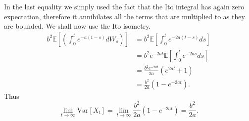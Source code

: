 \documentclass[a4paper,12pt]{article} %
\newcommand{\Var}{\mathrm{Var}}
\begin{document}
In the last equality we simply used the fact that the Ito integral has again zero expectation, therefore it annihilates all the terms that are multiplied to as they are bounded. We shall now use the Ito isometry.
\begin{align*}
    b^2 \mathbb{E} \left[ \left( \int _0^t e^{-a(t-s)}dW_s \right)  \right] & = b^{2} \mathbb{E} \left[ \int _0^t e^{-2a(t-s)}ds \right]   \\
                                                                            & = b^2 e^{-2at}\mathbb{E} \left[ \int _0^t e^{-2as}ds \right] \\
                                                                            & = \frac{b^{2} e^{-2at}}{2a}(e^{2at}+1)                       \\
                                                                            & = \frac{b^{2} }{2a}(1- e^{-2at}).
\end{align*}
Thus
\begin{equation}
    \lim_{t \to \infty}  \Var\left[X_t \right] = \lim_{t \to \infty}\frac{b^{2} }{2a}(1- e^{-2at})  = \frac{b^{2} }{2a}.
\end{equation}
\end{document}
